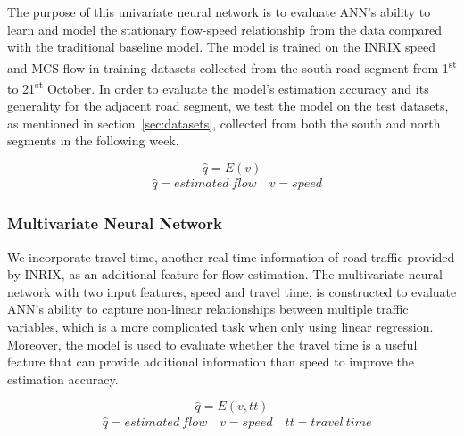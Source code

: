 \documentclass[english]{kththesis}
\begin{document}
The purpose of this univariate neural network is to evaluate ANN's ability to learn and model the stationary flow-speed relationship from the data compared with the traditional baseline model. The model is trained on the INRIX speed and MCS flow in training datasets collected from the south road segment from 1\textsuperscript{st} to 21\textsuperscript{st} October. In order to evaluate the model's estimation accuracy and its generality for the adjacent road segment, we test the model on the test datasets, as mentioned in section~\ref{sec:datasets}, collected from both the south and north segments in the following week.

\begin{equation}
    \hat{q} = E(v)
    \label{eq:ann_spd}
\end{equation}
\begin{align*}
    & \hat{q} = estimated \ flow \quad v=speed
\end{align*}

\subsubsection{Multivariate Neural Network}
\label{subsubsec:multivariateNeuralNetwork}
We incorporate travel time, another real-time information of road traffic provided by INRIX, as an additional feature for flow estimation. The multivariate neural network with two input features, speed and travel time, is constructed to evaluate ANN's ability to capture non-linear relationships between multiple traffic variables, which is a more complicated task when only using linear regression. Moreover, the model is used to evaluate whether the travel time is a useful feature that can provide additional information than speed to improve the estimation accuracy. 

\begin{equation}
    \hat{q} = E(v,tt)
    \label{eq:ann_spd_tt}
\end{equation}
\begin{align*}
    & \hat{q} = estimated \ flow \quad v=speed \quad tt = travel \ time
\end{align*}
\end{document}
